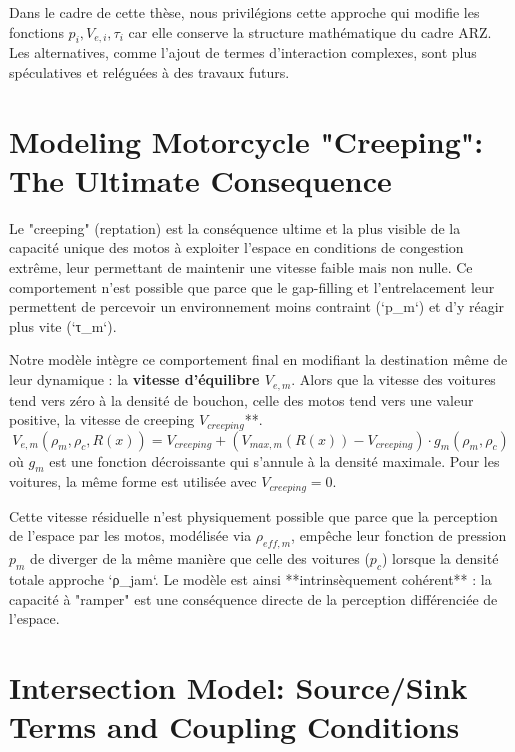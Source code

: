 Dans le cadre de cette thèse, nous privilégions cette approche qui modifie les fonctions \( p_i, V_{e,i}, \tau_i \) car elle conserve la structure mathématique du cadre ARZ. Les alternatives, comme l'ajout de termes d'interaction complexes, sont plus spéculatives et reléguées à des travaux futurs.

\section{Modeling Motorcycle "Creeping": The Ultimate Consequence}
\label{sec:modeling_creeping}

Le "creeping" (reptation) est la conséquence ultime et la plus visible de la capacité unique des motos à exploiter l'espace en conditions de congestion extrême, leur permettant de maintenir une vitesse faible mais non nulle. Ce comportement n'est possible que parce que le gap-filling et l'entrelacement leur permettent de percevoir un environnement moins contraint (`p_m`) et d'y réagir plus vite (`τ_m`).

Notre modèle intègre ce comportement final en modifiant la destination même de leur dynamique : la \textbf{vitesse d'équilibre \( V_{e,m} \)}. Alors que la vitesse des voitures tend vers zéro à la densité de bouchon, celle des motos tend vers une valeur positive, la vitesse de creeping \( V_{creeping} \)**.
\begin{equation}
    \label{eq:Ve_m_creeping}
    V_{e,m}(\rho_m, \rho_c, R(x)) = V_{creeping} + \left(V_{max,m}(R(x)) - V_{creeping}\right) \cdot g_m(\rho_m, \rho_c)
\end{equation}
où \( g_m \) est une fonction décroissante qui s'annule à la densité maximale. Pour les voitures, la même forme est utilisée avec \( V_{creeping} = 0 \).

Cette vitesse résiduelle n'est physiquement possible que parce que la perception de l'espace par les motos, modélisée via \( \rho_{eff,m} \), empêche leur fonction de pression \( p_m \) de diverger de la même manière que celle des voitures (\( p_c \)) lorsque la densité totale approche `ρ_jam`. Le modèle est ainsi **intrinsèquement cohérent** : la capacité à "ramper" est une conséquence directe de la perception différenciée de l'espace.

\section{Intersection Model: Source/Sink Terms and Coupling Conditions}
\label{sec:modeling_intersections}

